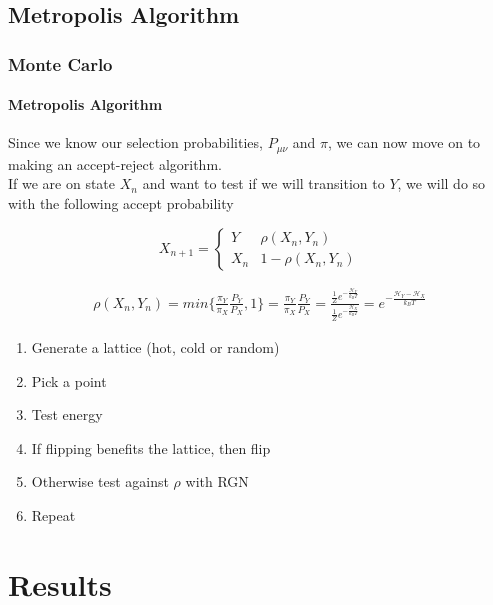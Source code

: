 \subsection{Metropolis Algorithm}
\begin{frame}
\frametitle{Monte Carlo}
\framesubtitle{Metropolis Algorithm}
Since we know our selection probabilities, $P_{\mu\nu}$ and $ \pi $, we can now move on to making an accept-reject algorithm.\\
If we are on state $ X_n $ and want to test if we will transition to $ Y $, we will do so with the following accept probability

\begin{equation}
X_{n+1} = 
	\begin{cases}
		Y & \rho(X_n,Y_n) \\
		X_n & 1-\rho(X_n,Y_n)
	\end{cases}
\end{equation}

\begin{multline}
	\rho(X_n,Y_n) = 
	min\bigg\{\frac{\pi_Y}{\pi_X}\frac{P_Y}{P_X},1\bigg\} =
	\frac{\pi_Y}{\pi_X}\frac{P_Y}{P_X} = 
	\frac{\frac{1}{Z}e^{-\frac{\mathcal{H}_Y}{k_B T}}}{\frac{1}{Z}e^{-\frac{\mathcal{H}_X}{k_B T}}} =
	e^{-\frac{\mathcal{H}_Y - \mathcal{H}_X}{k_B T}}
\end{multline}

\end{frame}
\begin{frame}
\begin{enumerate}
	\item Generate a lattice (hot, cold or random)
	\item Pick a point
	\item Test energy
	\item If flipping benefits the lattice, then flip
	\item Otherwise test against $\rho$ with RGN
	\item Repeat
\end{enumerate}
\end{frame}
\section{Results}
